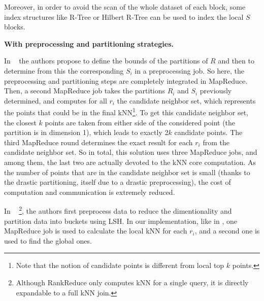  Moreover, in order to avoid the scan of the whole dataset of each block, some index structures like R-Tree \cite{Zhang:2012:EPK:2247596.2247602} or Hilbert R-Tree \cite{6967143} can be used to index the local $S$ blocks. 

\vspace{0.3em}

\noindent \textbf{With preprocessing and partitioning strategies.} 

\noindent
In \Z~ \cite{Zhang:2012:EPK:2247596.2247602} the authors propose  to define the bounds of the partitions of $R$ and then to determine from this the 
corresponding $S_i$ in a preprocessing job. So here, the preprocessing and partitioning steps are completely integrated in MapReduce. Then, a 
second MapReduce job takes the partitions $R_i$ and $S_i$ previously determined, and computes for all $r_i$ the candidate neighbor set, which 
represents the points that could be in the final kNN\footnote{Note that the notion of candidate points is different from local top $k$ points.}.
To get this candidate neighbor set, the closest $k$ points are taken from either side of the considered point (the partition is in dimension 1), which leads to exactly 2$k$ candidate points.
The third MapReduce round determines the exact result for each $r_i$ from the candidate neighbor set.
So in total, this solution uses three MapReduce jobs, and among them, the last two are actually devoted to the kNN core 
computation. As the number of points that are in the candidate neighbor set is small (thanks to the drastic 
partitioning, itself due to a drastic preprocessing), the cost of computation and communication is extremely reduced.

In \LSH~ \cite{Stupar10rankreduce-}\footnote{Although RankReduce only computes kNN for a single query, it is 
directly expandable to a full kNN join.}, the authors first preprocess  data to reduce the dimentionality and partition data into buckets 
using LSH. In our implementation, like in \Z,  one MapReduce job is used to calculate the local kNN for each $r_i$, and 
a second one is used to find the global ones.
